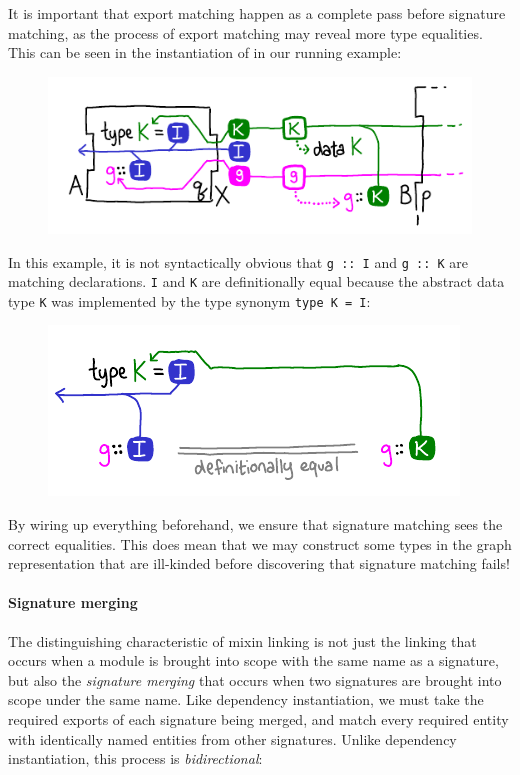 It is important that export matching happen as a complete pass before
signature matching, as the process of export matching may reveal more
type equalities.  This can be seen in the instantiation of  in
our running example:

\begin{figure}[H]
\center\includegraphics{figures/instantiation-with-synonyms.pdf}
\end{figure}

\noindent
In this example, it is not syntactically obvious that \verb|g :: I|
and \verb|g :: K| are matching declarations.  \verb|I|
and \verb|K| are definitionally equal because the abstract data type \verb|K|
was implemented by the type synonym \verb|type K = I|:

\begin{figure}[H]
\center\includegraphics{figures/instantiation-with-synonyms-reduced.pdf}
\end{figure}

\noindent
By wiring up everything beforehand, we ensure that signature matching
sees the correct equalities.  This does mean that we may construct some
types in the graph representation that are ill-kinded before discovering
that signature matching fails!

\paragraph{Signature merging}  The distinguishing characteristic of mixin
linking is not just the linking that occurs when a module is brought into
scope with the same name as a signature, but also the \emph{signature merging}
that occurs when two signatures are brought into scope under the same name.
Like dependency instantiation, we must take the required exports of each
signature being merged, and match every required entity with identically
named entities from other signatures.  Unlike dependency instantiation,
this process is \emph{bidirectional}:

